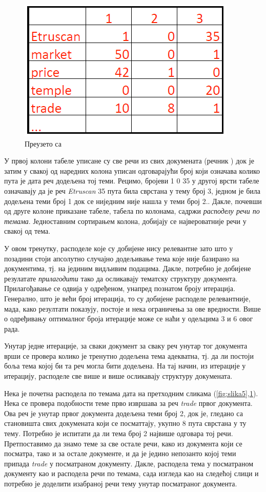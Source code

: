 \begin{figure}[H]
    \centering
   \includegraphics[scale=0.6]{./Slike/slika6.png} 
	\caption{Преузето са \cite{mimno1}}
	\label{fig:slika6}
\end{figure}
У првој колони табеле уписане су све речи из свих докумената (речник ) док је затим у свакој од наредних колона уписан одговарајући број који означава колико пута је дата реч додељена тој теми. Рецимо, бројеви 1 0 35 у другој врсти табеле означавају да је реч \textit{Etruscan} 35 пута била сврстана у тему број 3, једном је била додељена теми број 1 док се ниједним није нашла у теми број 2..
Дакле, почевши од друге колоне приказане табеле, табела по колонама, садржи  \textit{расподелу речи по темама}. Једноставним сортирањем колона, добијају се највероватније речи у свакој од тема.

У овом тренутку, расподеле које су добијене нису релевантне зато што у позадини стоји апсолутно случајно додељивање тема које није базирано на документима, тј. на јединим видљивим подацима.
Дакле, потребно је добијене резулатате \textit{прилагодити} тако да осликавају тематску структуру документа. Прилагођавање се одвија у одређеном, унапред познатом броју итерација. Генерално, што је већи број итерација, то су добијене расподеле релевантније, мада, како резултати показују, постоје и нека ограничења за ове вредности. Више о одређивању оптималног броја итерације може се наћи у одељцима 3 и 6 овог рада.

Унутар једне итерације, за сваки документ  за сваку реч унутар тог документа врши се провера колико је тренутно додељена тема адекватна, тј. да ли постоји боља тема којој би та реч могла бити додељена. На тај начин, из итерације у итерацију, расподеле све више и више осликавају структуру докумената.

Нека је почетна расподела по темама дата на претходним сликама (\ref{fig:slika5},\ref{fig:slika6}). Нека се провера подобности теме прво извршава за реч \textit{trade} првог документа. Ова реч је унутар првог документа додељена теми број 2, док је, гледано са становишта свих докумената који се посматтају, укупно 8 пута сврстана у ту тему. Потребно је испитати да ли тема број 2 највише одговара тој речи.
Претпоставимо да знамо теме за све остале речи, како из документа који се посматра, тако и за остале документе, и да је једино непозанто којој теми припада \textit{trade}  у посматраном документу.
Дакле, расподела тема у посматраном документу као и расподела речи по темама, сада изгледа као на следећој слици и потребно је доделити изабраној речи тему унутар посматраног документа.

